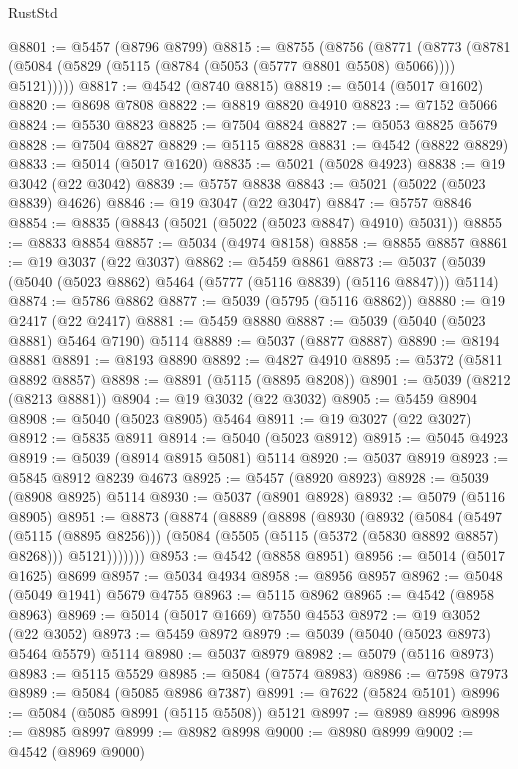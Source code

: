 \begin{lexlean}{RustStd}
\begin{coremodule}
@8801 := @5457 (@8796 @8799)
@8815 := @8755
    (@8756
      (@8771
        (@8773 (@8781 (@5084 (@5829 (@5115 (@8784 (@5053 (@5777 @8801 @5508) @5066)))) @5121)))))
@8817 := @4542 (@8740 @8815)
@8819 := @5014 (@5017 @1602)
@8820 := @8698 @7808
@8822 := @8819 @8820 @4910
@8823 := @7152 @5066
@8824 := @5530 @8823
@8825 := @7504 @8824
@8827 := @5053 @8825 @5679
@8828 := @7504 @8827
@8829 := @5115 @8828
@8831 := @4542 (@8822 @8829)
@8833 := @5014 (@5017 @1620)
@8835 := @5021 (@5028 @4923)
@8838 := @19 @3042 (@22 @3042)
@8839 := @5757 @8838
@8843 := @5021 (@5022 (@5023 @8839) @4626)
@8846 := @19 @3047 (@22 @3047)
@8847 := @5757 @8846
@8854 := @8835 (@8843 (@5021 (@5022 (@5023 @8847) @4910) @5031))
@8855 := @8833 @8854
@8857 := @5034 (@4974 @8158)
@8858 := @8855 @8857
@8861 := @19 @3037 (@22 @3037)
@8862 := @5459 @8861
@8873 := @5037 (@5039 (@5040 (@5023 @8862) @5464 (@5777 (@5116 @8839) (@5116 @8847))) @5114)
@8874 := @5786 @8862
@8877 := @5039 (@5795 (@5116 @8862))
@8880 := @19 @2417 (@22 @2417)
@8881 := @5459 @8880
@8887 := @5039 (@5040 (@5023 @8881) @5464 @7190) @5114
@8889 := @5037 (@8877 @8887)
@8890 := @8194 @8881
@8891 := @8193 @8890
@8892 := @4827 @4910
@8895 := @5372 (@5811 @8892 @8857)
@8898 := @8891 (@5115 (@8895 @8208))
@8901 := @5039 (@8212 (@8213 @8881))
@8904 := @19 @3032 (@22 @3032)
@8905 := @5459 @8904
@8908 := @5040 (@5023 @8905) @5464
@8911 := @19 @3027 (@22 @3027)
@8912 := @5835 @8911
@8914 := @5040 (@5023 @8912)
@8915 := @5045 @4923
@8919 := @5039 (@8914 @8915 @5081) @5114
@8920 := @5037 @8919
@8923 := @5845 @8912 @8239 @4673
@8925 := @5457 (@8920 @8923)
@8928 := @5039 (@8908 @8925) @5114
@8930 := @5037 (@8901 @8928)
@8932 := @5079 (@5116 @8905)
@8951 := @8873
    (@8874
      (@8889
        (@8898
          (@8930
            (@8932
              (@5084
                (@5497 (@5115 (@8895 @8256)))
                (@5084 (@5505 (@5115 (@5372 (@5830 @8892 @8857) @8268))) @5121)))))))
@8953 := @4542 (@8858 @8951)
@8956 := @5014 (@5017 @1625) @8699
@8957 := @5034 @4934
@8958 := @8956 @8957
@8962 := @5048 (@5049 @1941) @5679 @4755
@8963 := @5115 @8962
@8965 := @4542 (@8958 @8963)
@8969 := @5014 (@5017 @1669) @7550 @4553
@8972 := @19 @3052 (@22 @3052)
@8973 := @5459 @8972
@8979 := @5039 (@5040 (@5023 @8973) @5464 @5579) @5114
@8980 := @5037 @8979
@8982 := @5079 (@5116 @8973)
@8983 := @5115 @5529
@8985 := @5084 (@7574 @8983)
@8986 := @7598 @7973
@8989 := @5084 (@5085 @8986 @7387)
@8991 := @7622 (@5824 @5101)
@8996 := @5084 (@5085 @8991 (@5115 @5508)) @5121
@8997 := @8989 @8996
@8998 := @8985 @8997
@8999 := @8982 @8998
@9000 := @8980 @8999
@9002 := @4542 (@8969 @9000)

\end{coremodule}
\end{lexlean}

